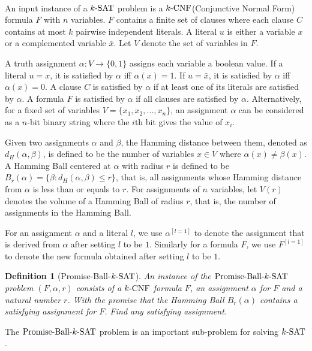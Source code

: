 \documentclass[a4paper,12pts]{article}
\newcommand{\SAT}{\textnormal{$k$-SAT}}
\newcommand{\CNF}{\textnormal{$k$-CNF}}
\newcommand{\dist}[2]{d_H(#1,#2)}
\newcommand{\ball}[2]{B_{#1}(#2)}
\newcommand{\PBS}{\textnormal{Promise-Ball-$\SAT$}}
\newtheorem{definition}{Definition}
\begin{document}
\paragraph{} An input instance of a $\SAT$ problem is a $\CNF$(Conjunctive Normal Form) formula $F$ with $n$ variables. $F$ contains a finite set of clauses where each clause $C$ contains at most $k$ pairwise independent literals. A literal $u$ is either a variable $x$ or a complemented variable $\bar{x}$. Let $V$ denote the set of variables in $F$. \par 
A truth assignment $\alpha: V\rightarrow \{0,1\}$ assigns each variable a boolean value. If a literal $u = x$, it is satisfied by $\alpha$ iff $\alpha(x) = 1$. If $u = \bar{x}$, it is satisfied by $\alpha$ iff $\alpha(x) = 0$. A clause $C$ is satisfied by $\alpha$ if at least one of its literals are satisfied by $\alpha$. A formula $F$ is satisfied by $\alpha$ if all clauses are satisfied by $\alpha$. Alternatively, for a fixed set of variables $V=\{x_1,x_2,...,x_n\}$, an assignment $\alpha$ can be considered as a $n$-bit binary string where the $i$th bit gives the value of $x_i$.\par 
Given two assignments $\alpha$ and $\beta$, the Hamming distance between them, denoted as $\dist{\alpha}{\beta}$, is defined to be the number of variables $x \in V$ where $\alpha(x) \neq \beta(x)$. A Hamming Ball centered at $\alpha$ with radius $r$ is defined to be $\ball{r}{\alpha} = \{\beta: \dist{\alpha}{\beta} \leq r\}$, that is, all assignments whose Hamming distance from $\alpha$ is less than or equals to $r$. For assignments of $n$ variables, let $V(r)$ denotes the volume of a Hamming Ball of radius $r$, that is, the number of assignments in the Hamming Ball.\par 
For an assignment $\alpha$ and a literal $l$, we use $\alpha^{[l = 1]}$ to denote the assignment that is derived from $\alpha$ after setting $l$ to be $1$. Similarly for a formula $F$, we use $F^{[l = 1]}$ to denote the new formula obtained after setting $l$ to be $1$. \par 
\begin{definition}[\PBS\cite{Moser11}]
	An instance of the $\PBS$ problem $(F,\alpha,r)$ consists of a $\CNF$ formula $F$, an assignment $\alpha$ for $F$ and a natural number $r$. With the promise that the Hamming Ball $\ball{r}{\alpha}$ contains a satisfying assignment for $F$. Find any satisfying assignment.
\end{definition}
The $\PBS$ problem is an important sub-problem for solving $\SAT$. 
\end{document}
